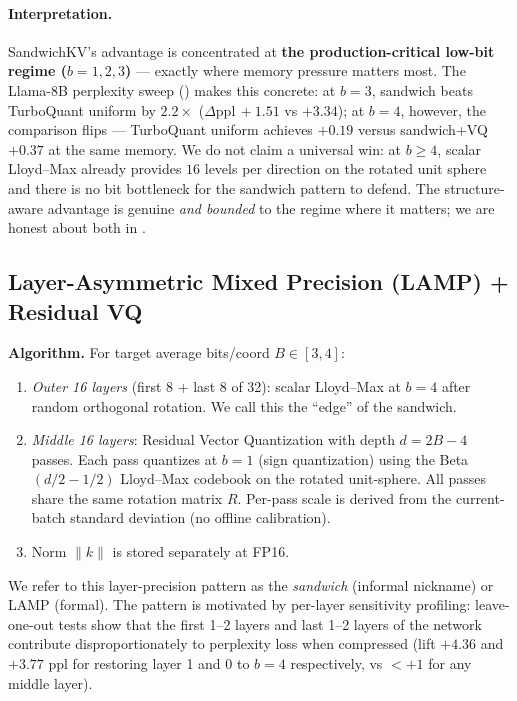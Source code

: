 \documentclass[11pt]{article}
\theoremstyle{definition}
\begin{document}
\paragraph{Interpretation.} SandwichKV's advantage is concentrated at \textbf{the production-critical low-bit regime ($b{=}1, 2, 3$)} --- exactly where memory pressure matters most. The Llama-8B perplexity sweep () makes this concrete: at $b{=}3$, sandwich beats TurboQuant uniform by $2.2\times$ ($\Delta\text{ppl}\,{+}1.51$ vs ${+}3.34$); at $b{=}4$, however, the comparison flips --- TurboQuant uniform achieves ${+}0.19$ versus sandwich+VQ ${+}0.37$ at the same memory. We do not claim a universal win: at $b{\ge}4$, scalar Lloyd--Max already provides $16$ levels per direction on the rotated unit sphere and there is no bit bottleneck for the sandwich pattern to defend. The structure-aware advantage is genuine \emph{and bounded} to the regime where it matters; we are honest about both in .

\subsection{Layer-Asymmetric Mixed Precision (LAMP) + Residual VQ}
\label{sec:sandwich}

\textbf{Algorithm.} For target average bits/coord $B \in [3, 4]$:
\begin{enumerate}\itemsep0pt
    \item \emph{Outer 16 layers} (first 8 + last 8 of 32): scalar Lloyd--Max at $b{=}4$ after random orthogonal rotation. We call this the ``edge'' of the sandwich.
    \item \emph{Middle 16 layers}: Residual Vector Quantization with depth $d = 2B - 4$ passes. Each pass quantizes at $b{=}1$ (sign quantization) using the Beta$(d/2{-}1/2)$ Lloyd--Max codebook on the rotated unit-sphere. All passes share the same rotation matrix $R$. Per-pass scale is derived from the current-batch standard deviation (no offline calibration).
    \item Norm $\|k\|$ is stored separately at FP16.
\end{enumerate}

We refer to this layer-precision pattern as the \emph{sandwich} (informal nickname) or LAMP (formal). The pattern is motivated by per-layer sensitivity profiling: leave-one-out tests show that the first 1--2 layers and last 1--2 layers of the network contribute disproportionately to perplexity loss when compressed (lift $+4.36$ and $+3.77$ ppl for restoring layer 1 and 0 to $b{=}4$ respectively, vs $<+1$ for any middle layer).
\end{document}
